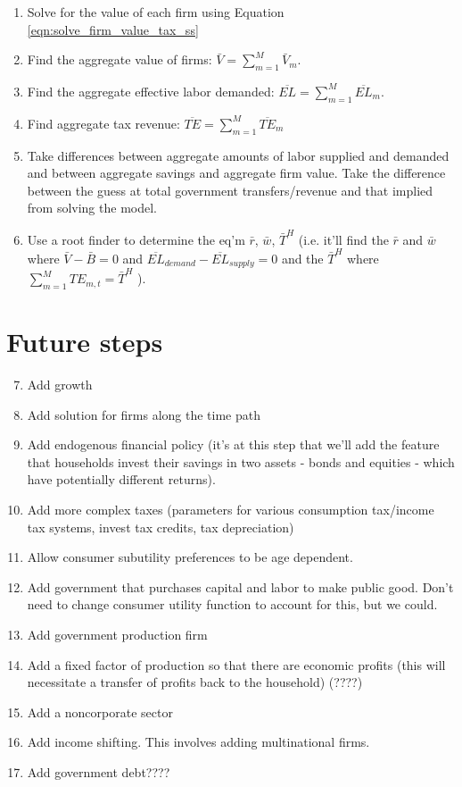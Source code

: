\documentclass[letterpaper,12pt]{article}
\theoremstyle{definition}
\begin{document}
\begin{spacing}{1.5}
\begin{enumerate}
\item Solve for the value of each firm using Equation \ref{eqn:solve_firm_value_tax_ss}
\item Find the aggregate value of firms: $\bar{V} = \sum_{m=1}^{M}\bar{V}_{m}$.
\item Find the aggregate effective labor demanded: $\overline{EL} =\sum_{m=1}^{M} \overline{EL}_{m}$.
\item Find aggregate tax revenue: $\overline{TE}= \sum_{m=1}^{M}\overline{TE}_{m}$
\item Take differences between aggregate amounts of labor supplied and demanded and between aggregate savings and aggregate firm value.  Take the difference between the guess at total government transfers/revenue and that implied from solving the model.
\item Use a root finder to determine the eq'm $\bar{r}$, $\bar{w}$, $\bar{T}^{H}$ (i.e. it'll find the $\bar{r}$ and $\bar{w}$ where $\bar{V}-\bar{B}=0$ and $\overline{EL}_{demand}-\overline{EL}_{supply}=0$ and the $\bar{T}^{H}$ where $\sum_{m=1}^{M}TE_{m,t}=\bar{T}^{H}$ ).
\end{enumerate}



\section*{Future steps}

\begin{enumerate}
\setcounter{enumi}{6}
\item Add growth
\item Add solution for firms along the time path
\item Add endogenous financial policy (it's at this step that we'll add the feature that households invest their savings in two assets - bonds and equities - which have potentially different returns).
\item Add more complex taxes (parameters for various consumption tax/income tax systems, invest tax credits, tax depreciation)
\item Allow consumer subutility preferences to be age dependent.
\item Add government that purchases capital and labor to make public good.  Don't need to change consumer utility function to account for this, but we could.
\item Add government production firm
\item Add a fixed factor of production so that there are economic profits (this will necessitate a transfer of profits back to the household) (????)
\item Add a noncorporate sector
\item Add income shifting.  This involves adding multinational firms.
\item Add government debt????
\end{enumerate}


\end{spacing}

\clearpage

%  
\end{document}
